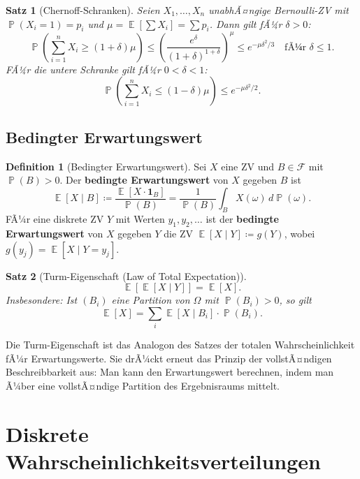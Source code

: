 ﻿\documentclass[12pt,a4paper]{article}
\theoremstyle{definition}
\newtheorem{definition}{Definition}[section]
\theoremstyle{plain}
\newtheorem{satz}{Satz}[section]
\theoremstyle{remark}
\DeclareMathOperator{\E}{\mathbb{E}}
\DeclareMathOperator{\Prob}{\mathbb{P}}
\begin{document}
\begin{satz}[Chernoff-Schranken]\label{satz:chernoff}
  Seien $X_1, \ldots, X_n$ unabhÃ¤ngige Bernoulli-ZV mit $\Prob(X_i=1) = p_i$
  und $\mu = \E\!\left[\sum X_i\right] = \sum p_i$. Dann gilt fÃ¼r $\delta > 0$:
  \[
    \Prob\!\left(\sum_{i=1}^n X_i \geq (1+\delta)\mu\right)
    \leq \left(\frac{e^\delta}{(1+\delta)^{1+\delta}}\right)^{\mu}
    \leq e^{-\mu\delta^2/3} \quad \text{fÃ¼r } \delta \leq 1.
  \]
  FÃ¼r die untere Schranke gilt fÃ¼r $0 < \delta < 1$:
  \[
    \Prob\!\left(\sum_{i=1}^n X_i \leq (1-\delta)\mu\right)
    \leq e^{-\mu\delta^2/2}.
  \]
\end{satz}

\subsection{Bedingter Erwartungswert}

\begin{definition}[Bedingter Erwartungswert]\label{def:bedEW}
  Sei $X$ eine ZV und $B \in \mathcal{F}$ mit $\Prob(B) > 0$. Der
  \textbf{bedingte Erwartungswert} von $X$ gegeben $B$ ist
  \[
    \E[X \mid B] \coloneqq \frac{\E[X \cdot \mathbf{1}_B]}{\Prob(B)}
    = \frac{1}{\Prob(B)} \int_B X(\omega)\,d\Prob(\omega).
  \]
  FÃ¼r eine diskrete ZV $Y$ mit Werten $y_1, y_2, \ldots$ ist der
  \textbf{bedingte Erwartungswert} von $X$ gegeben $Y$ die ZV
  $\E[X \mid Y] \coloneqq g(Y)$, wobei
  $g(y_j) = \E[X \mid Y = y_j]$.
\end{definition}

\begin{satz}[Turm-Eigenschaft (Law of Total Expectation)]\label{satz:turm}
  \[
    \E\!\left[\E[X \mid Y]\right] = \E[X].
  \]
  Insbesondere: Ist $(B_i)$ eine Partition von $\Omega$ mit $\Prob(B_i)>0$,
  so gilt
  \[
    \E[X] = \sum_i \E[X \mid B_i] \cdot \Prob(B_i).
  \]
\end{satz}

Die Turm-Eigenschaft ist das Analogon des Satzes der totalen
Wahrscheinlichkeit fÃ¼r Erwartungswerte. Sie drÃ¼ckt erneut das Prinzip der
vollstÃ¤ndigen Beschreibbarkeit aus: Man kann den Erwartungswert berechnen,
indem man Ã¼ber eine vollstÃ¤ndige Partition des Ergebnisraums mittelt.

\section{Diskrete Wahrscheinlichkeitsverteilungen}
\label{sec:verteilungen}
\end{document}
